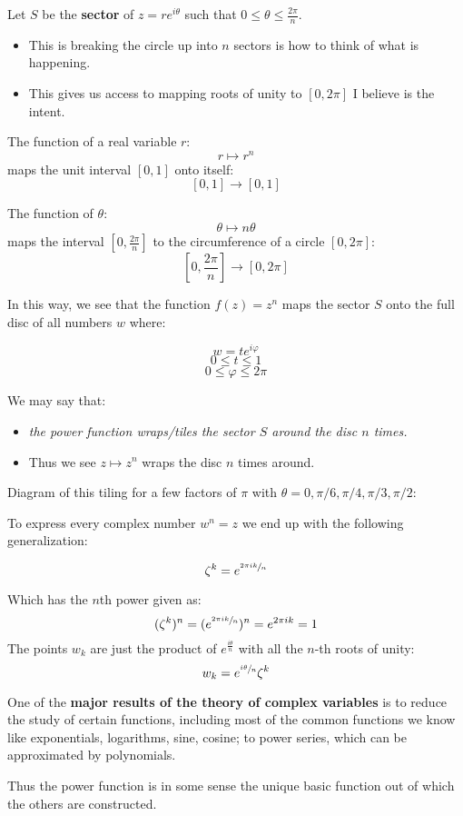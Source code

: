 Let $S$ be the \textbf{sector} of $z = re^{i\theta}$ such that $0 \leq \theta \leq \frac{2\pi}{n}.$ 
\begin{itemize}
	\item This is breaking the circle up into $n$ sectors is how to think of what is happening. 
	\item This gives us access to mapping roots of unity to $[0, 2\pi]$ I believe is the intent.
\end{itemize}

The function of a real variable $r$:
\[r \mapsto r^n \]
maps the unit interval $[0, 1]$ onto itself:
\[[0, 1] \to [0, 1] \]

The function of $\theta$:
\[\theta \mapsto n\theta \]
maps the interval $[0, \frac{2\pi}{n}]$ to the circumference of a circle $[0, 2\pi]$:
\[ \left[ 0, \frac{2\pi}{n} \right] \to [0, 2\pi] \]

In this way, we see that the function $f(z) = z^n$ maps the sector $S$ onto the full disc of all numbers $w$ where:

\[w = te^{i\varphi} \]
\[0 \leq t \leq 1\]
\[0 \leq \varphi \leq 2\pi \]

We may say that:
\begin{itemize}
	\item \textit{the power function wraps/tiles the sector $S$ around the disc $n$ times.}
	\item Thus we see $z \mapsto z^n$ wraps the disc $n$ times around.
\end{itemize}

Diagram of this tiling for a few factors of $\pi$ with $\theta = 0, \pi/6, \pi/4, \pi/3, \pi/2$:


To express every complex number $w^n = z$ we end up with the following generalization:
\begin{defn}
	\[\zeta^k = e^{\sfrac{2\pi ik}{n}}\]
\end{defn}
Which has the $n$th power given as:
\[ (\zeta^k)^n = ( e^{\sfrac{2\pi ik}{n}} )^n = e^{2\pi ik} = 1 \]
The points $w_k$ are just the product of $e^{\frac{i\theta}{n}}$ with all the $n$-th roots of unity:
\[w_k = e^{\sfrac{i\theta}{n}}\zeta^k\]

One of the \textbf{major results of the theory of complex variables} is to reduce the study of certain functions, including most of the 
common functions we know like exponentials, logarithms, sine, cosine; to power series, which can be approximated by polynomials.

Thus the power function is in some sense the unique basic function out of which the others are constructed.
